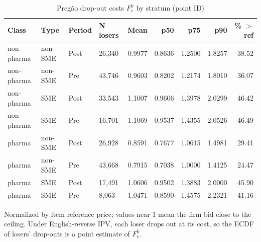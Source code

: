 \begin{table}[htbp]
\centering
\begin{threeparttable}
\caption{Preg\~ao drop-out costs $F_c^k$ by stratum (point ID)}
\label{tab:v3_pregao_fc_summary}
\small
\begin{tabular}{llllrrrrr}
\toprule
Class & Type & Period & N losers & Mean & p50 & p75 & p90 & \% $>$ ref \\
\midrule
non-pharma & non-SME & Post & 26,340 & 0.9977 & 0.8636 & 1.2500 & 1.8257 & 38.52 \\
non-pharma & non-SME & Pre & 43,746 & 0.9603 & 0.8202 & 1.2174 & 1.8010 & 36.07 \\
non-pharma & SME & Post & 33,543 & 1.1007 & 0.9606 & 1.3978 & 2.0299 & 46.42 \\
non-pharma & SME & Pre & 16,701 & 1.1069 & 0.9537 & 1.4355 & 2.0526 & 46.49 \\
pharma & non-SME & Post & 26,928 & 0.8591 & 0.7677 & 1.0615 & 1.4981 & 29.41 \\
pharma & non-SME & Pre & 43,668 & 0.7915 & 0.7038 & 1.0000 & 1.4125 & 24.47 \\
pharma & SME & Post & 17,491 & 1.0606 & 0.9502 & 1.3883 & 2.0000 & 45.90 \\
pharma & SME & Pre & 8,063 & 1.0471 & 0.8590 & 1.4575 & 2.2321 & 41.16 \\
\bottomrule
\end{tabular}
\begin{tablenotes}\footnotesize
\item Normalized by item reference price; values near 1 mean the
firm bid close to the ceiling. Under English-reverse IPV, each loser
drops out at its cost, so the ECDF of losers' drop-outs is a point
estimate of $F_c^k$.
\end{tablenotes}
\end{threeparttable}
\end{table}
